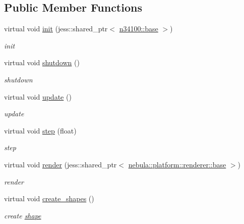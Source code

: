 \subsection*{Public Member Functions}
\begin{DoxyCompactItemize}
\item 
virtual void \hyperlink{classnebula_1_1content_1_1actor_1_1physics_1_1physx_1_1rigid__body_a737b1b04a6cdcbfed0643bf66f08aa84}{init} (jess::shared\_\-ptr$<$ \hyperlink{classnebula_1_1content_1_1actor_1_1admin_1_1base}{n34100::base} $>$)
\begin{DoxyCompactList}\small\item\em init \item\end{DoxyCompactList}\item 
virtual void \hyperlink{classnebula_1_1content_1_1actor_1_1physics_1_1physx_1_1rigid__body_a92e7c3f4ca5dad35ae7c656a64a18a0c}{shutdown} ()
\begin{DoxyCompactList}\small\item\em shutdown \item\end{DoxyCompactList}\item 
virtual void \hyperlink{classnebula_1_1content_1_1actor_1_1physics_1_1physx_1_1rigid__body_a4bd2572632f4e23314db0857e52b079c}{update} ()
\begin{DoxyCompactList}\small\item\em update \item\end{DoxyCompactList}\item 
virtual void \hyperlink{classnebula_1_1content_1_1actor_1_1physics_1_1physx_1_1rigid__body_a2f72e8366fb89b7a65d938b7a5082c6b}{step} (float)
\begin{DoxyCompactList}\small\item\em step \item\end{DoxyCompactList}\item 
virtual void \hyperlink{classnebula_1_1content_1_1actor_1_1physics_1_1physx_1_1rigid__body_a10d2a077db15282d4a53ce95264704a3}{render} (jess::shared\_\-ptr$<$ \hyperlink{classnebula_1_1platform_1_1renderer_1_1base}{nebula::platform::renderer::base} $>$)
\begin{DoxyCompactList}\small\item\em render \item\end{DoxyCompactList}\item 
virtual void \hyperlink{classnebula_1_1content_1_1actor_1_1physics_1_1physx_1_1rigid__body_a15dd07c3ef17ca72b4bc7c8c9a3c0dd7}{create\_\-shapes} ()
\begin{DoxyCompactList}\small\item\em create \hyperlink{namespacenebula_1_1content_1_1shape}{shape} \item\end{DoxyCompactList}\end{DoxyCompactItemize}
